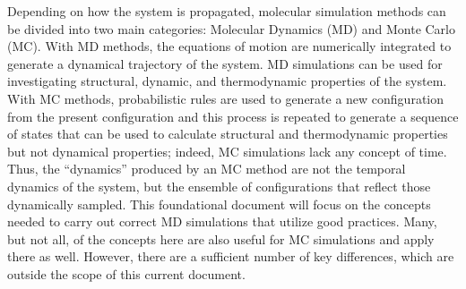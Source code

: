 \documentclass[9pt,bestpractices]{livecoms}
\begin{document}
Depending on how the system is propagated, molecular simulation methods can be divided into two main categories: Molecular Dynamics (MD) and Monte Carlo (MC).
With MD methods, the equations of motion are numerically integrated to generate a dynamical trajectory of the system. 
MD simulations can be used for investigating structural, dynamic, and thermodynamic properties of the system.
With MC methods, probabilistic rules are used to generate a new configuration from the present configuration and this process is repeated to generate a sequence of states that can be used to calculate structural and thermodynamic properties but not dynamical properties; indeed, MC simulations lack any concept of time. 
Thus, the ``dynamics'' produced by an MC method are not the temporal dynamics of the system, but the ensemble of configurations that reflect those dynamically sampled. 
This foundational document will focus on the concepts needed to carry out correct MD simulations that utilize good practices. 
Many, but not all, of the concepts here are also useful for MC simulations and apply there as well. However, there are a sufficient number of key differences, which are outside the scope of this current document.
\end{document}
